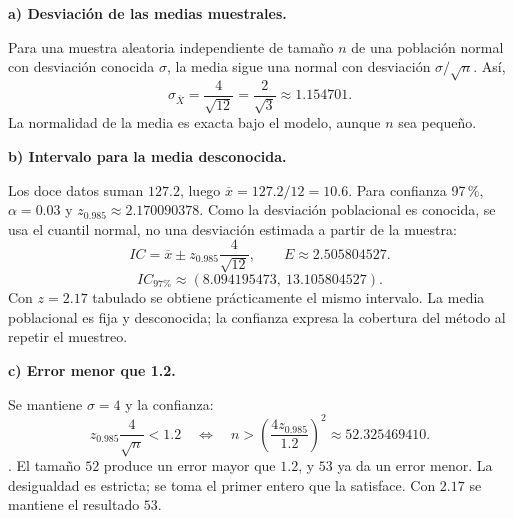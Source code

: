 \textbf{a) Desviación de las medias muestrales.}\par\nopagebreak[4]
Para una muestra aleatoria independiente de tamaño $n$ de una población normal con desviación conocida $\sigma$, la media sigue una normal con desviación $\sigma/\sqrt n$. Así,
\[
\boxed{\sigma_{\overline X}=\frac4{\sqrt{12}}=\frac2{\sqrt3}\approx1.154701.}
\]
La normalidad de la media es exacta bajo el modelo, aunque $n$ sea pequeño.

\textbf{b) Intervalo para la media desconocida.}\par\nopagebreak[4]
Los doce datos suman $127.2$, luego $\overline x=127.2/12=10.6$. Para confianza 97\,\%, $\alpha=0.03$ y $z_{0.985}\approx2.170090378$. Como la desviación poblacional es conocida, se usa el cuantil normal, no una desviación estimada a partir de la muestra:
\[
IC=\overline x\pm z_{0.985}\frac4{\sqrt{12}},\qquad
E\approx2.505804527.
\]
\[
\boxed{IC_{\text{97\%}}\approx(8.094195473,\ 13.105804527).}
\]
Con $z=2.17$ tabulado se obtiene prácticamente el mismo intervalo. La media poblacional es fija y desconocida; la confianza expresa la cobertura del método al repetir el muestreo.

\textbf{c) Error menor que 1.2.}\par\nopagebreak[4]
Se mantiene $\sigma=4$ y la confianza:
\[
z_{0.985}\frac4{\sqrt n}<1.2
\quad\Longleftrightarrow\quad
n>\left(\frac{4z_{0.985}}{1.2}\right)^2
\approx52.325469410.
\]
. El tamaño $52$ produce un error mayor que $1.2$, y $53$ ya da un error menor. La desigualdad es estricta; se toma el primer entero que la satisface. Con $2.17$ se mantiene el resultado $53$.
